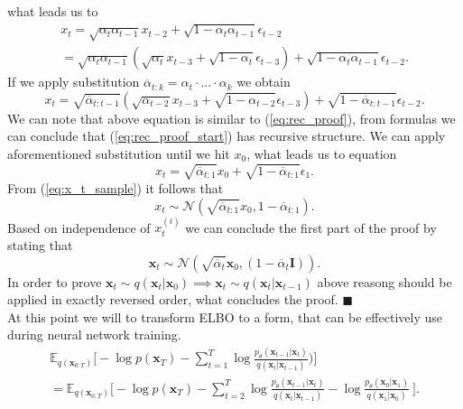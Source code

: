 \documentclass[10pt]{article}
\begin{document}
what leads us to
\begin{gather}
    x_{t} = \sqrt{  \alpha_{t} \alpha_{t-1} } x_{t-2} + \sqrt{1 - \alpha_{t}\alpha_{t-1}} \epsilon_{t-2} \\
    =  \sqrt{  \alpha_{t} \alpha_{t-1} } 
    (\sqrt{  \alpha_{t} } x_{t-3}  + \sqrt{ 1 - \alpha_{t}}\epsilon_{t-3})
    + \sqrt{1 - \alpha_{t}\alpha_{t-1}} \epsilon_{t-2}.
\end{gather}
If we apply substitution  $\overline{\alpha}_{t:k} = \alpha_{t} \cdot ... \cdot \alpha_{k}$ we obtain  
\begin{equation}
    x_{t} =  \sqrt{  \overline{\alpha}_{t:t-1} } 
    (\sqrt{  \alpha_{t-2} } x_{t-3}  + \sqrt{ 1 - \alpha_{t-2}}\epsilon_{t-3})
    + \sqrt{1 - \overline{\alpha}_{t:t-1}} \epsilon_{t-2}.
\end{equation}
We can note that above equation is similar to (\ref{eq:rec_proof}),
from formulas we can conclude that (\ref{eq:rec_proof_start}) has recursive structure. We can apply aforementioned substitution until we hit  $x_{0}$, what leads us to equation
\begin{equation} \label{eq:x_t_sample}
    x_{t} =  \sqrt{\overline{\alpha}_{t:1}  }x_{0} + \sqrt{1 - \overline{\alpha}_{t:1}} \epsilon_{1}.
\end{equation}
From (\ref{eq:x_t_sample}) it follows that 
\begin{equation}
     x_{t} \sim \mathcal{N}( \sqrt{\overline{\alpha}_{t:1}  }x_{0}, 1 - \overline{\alpha}_{t:1}).
\end{equation}
Based on independence of  $x_{t}^{(i)}$ we can conclude the first part of the proof by stating that
\begin{equation}
    \textbf{x}_{t} \sim 
    \mathcal{N}( \sqrt{\overline{\alpha}_{t}  }\textbf{x}_{0}, (1 - \overline{\alpha}_{t} \mathbf{I}) ).
\end{equation}
In order to prove $ \textbf{x}_{t} \sim  q(\textbf{x}_{t}| \textbf{x}_{0})
\implies
\textbf{x}_{t} \sim  q(\textbf{x}_{t}| \textbf{x}_{t-1} )$ above reasong should be applied in exactly reversed order, what concludes the proof. $\blacksquare$ \\
At this point we will to transform ELBO to a form, that can be effectively use during neural network training. 
\begin{gather}
     \mathbb{E}_{q(\textbf{x}_{0:T})} \Bigg[ -\log p( \textbf{x}_{T}) -  \sum_{t=1}^{T}\log
    \frac{ p_{\theta}( \textbf{x}_{t-1}|  \textbf{x}_{t }  )   }
    { q( \textbf{x}_{t}|  \textbf{x}_{t -1 }  )} ) \Bigg] \\
    = \mathbb{E}_{q(\textbf{x}_{0:T})} \Bigg[ -\log p( \textbf{x}_{T}) -  \sum_{t=2}^{T}\log
    \frac{ p_{\theta}( \textbf{x}_{t-1}|  \textbf{x}_{t }  )   }
    { q( \textbf{x}_{t}|  \textbf{x}_{t -1 }  )} - \log
    \frac{ p_{\theta}( \textbf{x}_{0}|  \textbf{x}_{1}  )   }
    { q( \textbf{x}_{1}|  \textbf{x}_{0}  )}
    \ \Bigg].
\end{gather}
\end{document}
